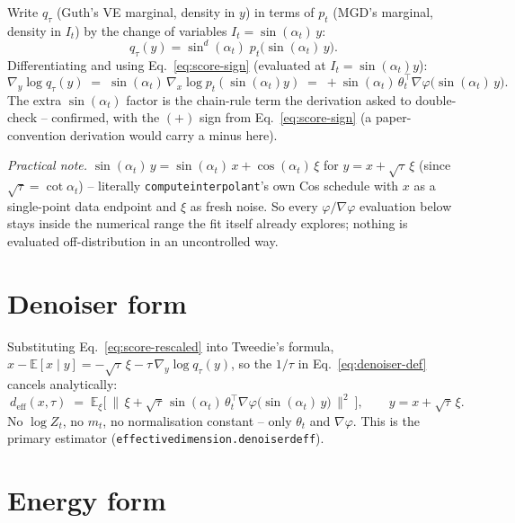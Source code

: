 \documentclass[11pt]{article}
\newcommand{\E}{\mathbb{E}}
\newcommand{\code}[1]{\texttt{#1}}
\renewcommand{\_}{\origunderscore\allowbreak}
\newcommand{\deff}{d_{\mathrm{eff}}}
\begin{document}
Write $q_\tau$ (Guth's VE marginal, density in $y$) in terms of $p_t$ (MGD's
marginal, density in $I_t$) by the change of variables $I_t = \sin(\alpha_t)\,y$:
\begin{equation}
  q_\tau(y) = \sin^d(\alpha_t)\; p_t\big(\sin(\alpha_t)\,y\big).
\end{equation}
Differentiating and using Eq.~\ref{eq:score-sign} (evaluated at $I_t = \sin(\alpha_t) y$):
\begin{equation}
  \nabla_y \log q_\tau(y) \;=\; \sin(\alpha_t)\,\nabla_x\log p_t(\sin(\alpha_t) y)
  \;=\; +\sin(\alpha_t)\,\theta_t^\top \nabla\varphi\big(\sin(\alpha_t)\,y\big).
  \label{eq:score-rescaled}
\end{equation}
The extra $\sin(\alpha_t)$ factor is the chain-rule term the derivation asked to
double-check -- confirmed, with the $(+)$ sign from Eq.~\ref{eq:score-sign} (a
paper-convention derivation would carry a minus here).

\emph{Practical note.} $\sin(\alpha_t)\,y = \sin(\alpha_t)\,x + \cos(\alpha_t)\,\xi$
for $y = x+\sqrt\tau\,\xi$ (since $\sqrt\tau = \cot\alpha_t$) -- literally
\code{compute\_interpolant}'s own Cos schedule with $x$ as a single-point data
endpoint and $\xi$ as fresh noise. So every $\varphi/\nabla\varphi$
evaluation below stays inside the numerical range the fit itself already
explores; nothing is evaluated off-distribution in an uncontrolled way.

\section{Denoiser form}

Substituting Eq.~\ref{eq:score-rescaled} into Tweedie's formula,
$x - \E[x\mid y] = -\sqrt\tau\,\xi - \tau\,\nabla_y\log q_\tau(y)$, so the
$1/\tau$ in Eq.~\ref{eq:denoiser-def} cancels analytically:
\begin{equation}
  \boxed{\ \deff(x,\tau) \;=\; \E_\xi\Big[\ \big\lVert\, \xi + \sqrt\tau\,\sin(\alpha_t)\,
  \theta_t^\top \nabla\varphi\big(\sin(\alpha_t)\,y\big) \,\big\rVert^2\ \Big], \qquad
  y = x + \sqrt\tau\,\xi. \ }
  \label{eq:deff-denoiser}
\end{equation}
No $\log Z_t$, no $m_t$, no normalisation constant -- only $\theta_t$ and
$\nabla\varphi$. This is the primary estimator
(\code{effective\_dimension.denoiser\_d\_eff}).

\section{Energy form}
\label{sec:energy-form}
\end{document}
